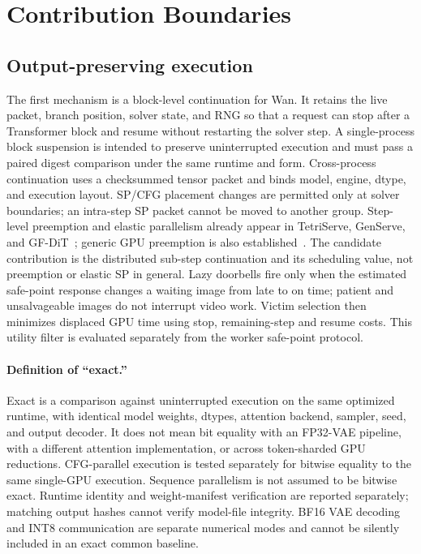 \documentclass[11pt,a4paper]{article}
\begin{document}
\section{Contribution Boundaries}
\subsection{Output-preserving execution}
The first mechanism is a block-level continuation for Wan. It retains the live
packet, branch position, solver state, and RNG so that a request can stop after
a Transformer block and resume without restarting the solver step. A
single-process block suspension is intended to preserve uninterrupted execution
and must pass a paired digest comparison under the same runtime and form.
Cross-process continuation uses a
checksummed tensor packet and binds model, engine, dtype, and execution layout.
SP/CFG placement changes are permitted only at solver boundaries; an intra-step
SP packet cannot be moved to another group.
Step-level preemption and elastic parallelism already appear in
TetriServe, GenServe, and GF-DiT~\cite{lu2026tetriserve,ye2026genserve,gfdit2026};
generic GPU preemption is also established~\cite{han2022reef}. The candidate
contribution is the distributed sub-step continuation and its scheduling value,
not preemption or elastic SP in general. Lazy doorbells fire only when the
estimated safe-point response changes a waiting image from late to on time;
patient and unsalvageable images do not interrupt video work. Victim selection
then minimizes displaced GPU time using stop, remaining-step and resume costs.
This utility filter is evaluated separately from the worker safe-point protocol.

\paragraph{Definition of ``exact.''}
Exact is a comparison against uninterrupted execution on the same optimized
runtime, with identical model weights, dtypes, attention backend, sampler, seed,
and output decoder. It does not mean bit equality with an FP32-VAE pipeline,
with a different attention implementation, or across token-sharded GPU
reductions. CFG-parallel execution is tested separately for bitwise equality to
the same single-GPU execution. Sequence parallelism is not assumed to be
bitwise exact. Runtime identity and weight-manifest verification are reported
separately; matching output hashes cannot verify model-file integrity.
BF16 VAE decoding and INT8 communication are separate numerical
modes and cannot be silently included in an exact common baseline.
\end{document}
